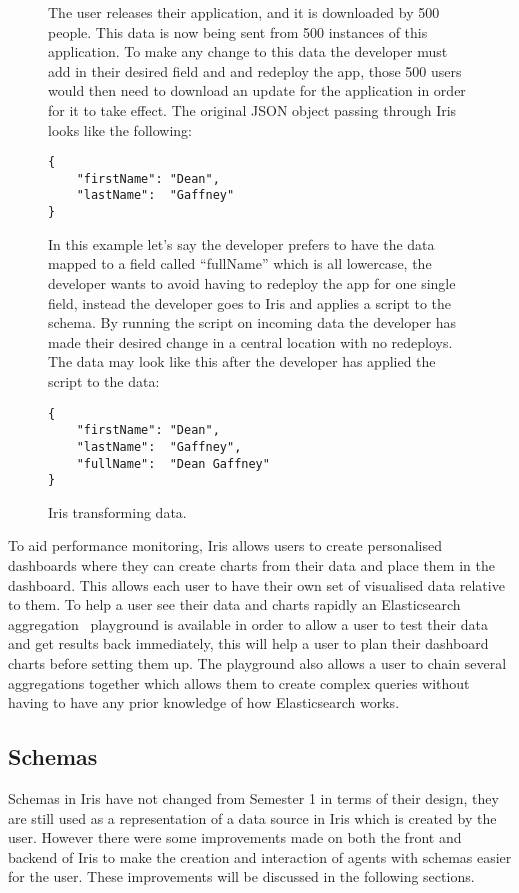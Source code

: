 \documentclass[12pt,a4paper,titlepage]{report}
\newcommand{\q}[1]{``#1''}
\begin{document}
\begin{figure}[H]
\begin{tcolorbox}

The user releases their application, and it is downloaded by 500 people. This data is now being sent from 500 instances of this application. To make any change to this data the developer must add in their desired field and and redeploy the app, those 500 users would then need to download an update for the application in order for it to take effect. The original JSON object passing through Iris looks like the following:
\begin{verbatim}
{
	"firstName": "Dean",
	"lastName":  "Gaffney"
}
\end{verbatim}

In this example let's say the developer prefers to have the data mapped to a field called \q{fullName} which is all lowercase, the developer wants to avoid having to redeploy the app for one single field, instead the developer goes to Iris and applies a script to the schema. By running the script on incoming data the developer has made their desired change in a central location with no redeploys. The data may look like this after the developer has applied the script to the data:
\begin{verbatim}
{
	"firstName": "Dean",
	"lastName":  "Gaffney",
	"fullName":  "Dean Gaffney"
}
\end{verbatim}
\end{tcolorbox}
\caption{Iris transforming data.}
\end{figure}

To aid performance monitoring, Iris allows users to create personalised dashboards where they can create charts from their data and place them in the dashboard. This allows each user to have their own set of visualised data relative to them. To help a user see their data and charts rapidly an Elasticsearch aggregation~\parencite{Elastic.co.Aggregations} playground is available in order to allow a user to test their data and get results back immediately, this will help a user to plan their dashboard charts before setting them up. The playground also allows a user to chain several aggregations together which allows them to create complex queries without having to have any prior knowledge of how Elasticsearch works.

 
\subsection{Schemas}
Schemas in Iris have not changed from Semester 1 in terms of their design, they are still used as a representation of a data source in Iris which is created by the user. However there were some improvements made on both the front and backend of Iris to make the creation and interaction of agents with schemas easier for the user. These improvements will be discussed in the following sections.
\end{document}
